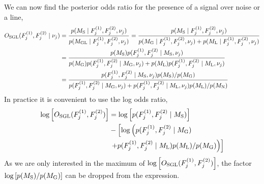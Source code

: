 %
We can now find the posterior odds ratio for the presence of a signal over noise or a line,
\begin{equation}
\label{viterbi:odds}
\begin{split}
O_{\rm{SGL}}(F^{(1)}_{j},F^{(2)}_{j}\mid\nu_j) &=  \frac{p(M_{\rm{S}} \mid F^{(1)}_{j},F^{(2)}_{j} ,\nu_j)}{p(M_{\rm{GL}} \mid F^{(1)}_{j},F^{(2)}_{j},\nu_j)}
= \frac{p(M_{\rm{S}} \mid F^{(1)}_{j},F^{(2)}_{j} ,\nu_j)}{p(M_{\rm{G}} \mid F^{(1)}_{j},F^{(2)}_{j} ,\nu_j) +p(M_{\rm{L}} \mid F^{(1)}_{j},F^{(2)}_{j} ,\nu_j)}\\
&=\frac{p(M_{\rm{S}})p(F^{(1)}_{j},F^{(2)}_{j} \mid M_{\rm{S}},\nu_j)}{p(M_{\rm{G}})p(F^{(1)}_{j},F^{(2)}_{j}\mid M_{\rm{G}},\nu_j) + p(M_{\rm{L}})p(F^{(1)}_{j},F^{(2)}_{j}\mid M_{\rm{L}},\nu_j) } \\
&= \frac{p(F^{(1)}_{j},F^{(2)}_{j} \mid M_{\rm{S}},\nu_j)p(M_{\rm{S}})/p(M_{\rm{G}})}{p(F^{(1)}_{j},F^{(2)}_{j}\mid M_{\rm{G}},\nu_j) + p(F^{(1)}_{j},F^{(2)}_{j}\mid M_{\rm{L}},\nu_j)p(M_{\rm{L}})/p(M_{\rm{N}}) }
\end{split}
\end{equation}
In practice it is convenient to use the log odds ratio,
\begin{equation}
\begin{split}
\label{viterbi:las:logodds}
\log\left[ O_{\rm{SGL}}(F^{(1)}_{j},F^{(2)}_{j})\right] &=  \log\left[ p(F^{(1)}_{j},F^{(2)}_{j} \mid M_{\rm{S}}) \right] \\
&- \left[ \log\left( p(F^{(1)}_{j},F^{(2)}_{j}\mid M_{\rm{G}}) \right. \right. \\
&\left.\left.+  p(F^{(1)}_{j},F^{(2)}_{j}\mid M_{\rm{L}})p(M_{\rm{L}})/p(M_{\rm{G}})\right) \right]
\end{split}
\end{equation}
As we are only interested in the maximum of $\log\left[ O_{\rm{SGL}}(F^{(1)}_{j},F^{(2)}_{j})\right]$, the factor $\log\left[ p(M_{\rm{S}})/p(M_{\rm{G}})\right]$ can be dropped from the expression.



